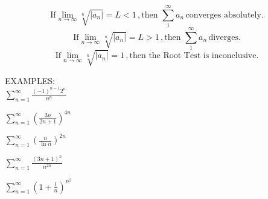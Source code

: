 \documentclass[11pt]{article}
\begin{document}
  \begin{displaymath}
\mbox{If} \lim_{n\to \infty}\sqrt[n]{|a_n|} = L < 1 \,, \mbox{then } \sum_1^{\infty}a_n \, \mbox{converges absolutely.}
  \end{displaymath}
    \begin{displaymath}
\mbox{If} \lim_{n\to \infty}\sqrt[n]{|a_n|} = L > 1 \,, \mbox{then } \sum_1^{\infty}a_n \, \mbox{diverges.}
      \end{displaymath}
  \begin{displaymath}
\mbox{If} \lim_{n\to \infty}\sqrt[n]{|a_n|} = 1 \,, \mbox{then the Root Test is inconclusive.}
      \end{displaymath}

  \vspace{0.2in}
  
  EXAMPLES:\\

  $\sum_{n=1}^{\infty} \frac{(-1)^{n-1}2^n}{n^n}$

  \vspace{2in}
  
    $\sum_{n=1}^{\infty} \left(\frac{3n}{2n+1}\right)^{4n}$  

\pagebreak

    $\sum_{n=1}^{\infty} \left(\frac{n}{\ln{n}}\right)^{2n}$  


\vspace{2in}

    $\sum_{n=1}^{\infty} \frac{(3n+1)^n}{n^{2n}}$  

\vspace{2in}

    $\sum_{n=1}^{\infty} \left(1 + \frac{1}{n}\right)^{n^2}$  
\end{document}
